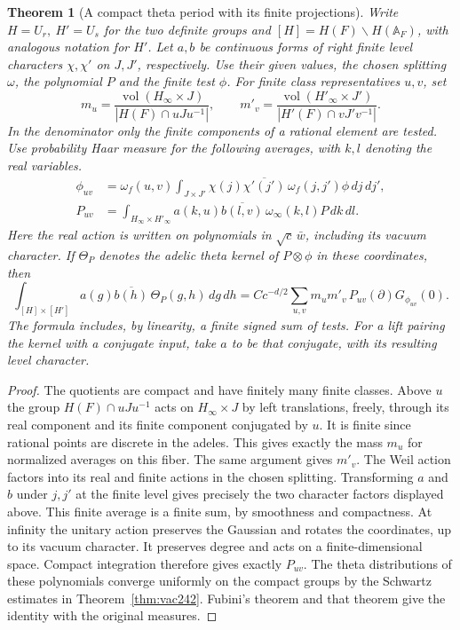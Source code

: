 \documentclass[a4paper,11pt]{article}
\newtheorem{theorem}[proposition]{Theorem}
\theoremstyle{definition}
\theoremstyle{remark}
\numberwithin{equation}{section}
\begin{document}
\begin{theorem}[A compact theta period with its finite projections]
\label{thm:edge242}
Write \(H=U_r,\ H'=U_s\) for the two definite groups and
\([H]=H(F)\backslash H(\mathbb A_F)\), with analogous notation
for \(H'\). Let \(a,b\) be continuous forms of right finite
level characters \(\chi,\chi'\) on \(J,J'\), respectively.
Use their given values, the chosen splitting \(\omega\), the
polynomial \(P\) and the finite test \(\phi\).
For finite class representatives \(u,v\), set
\[
 m_u=\frac{\operatorname{vol}(H_\infty\times J)}
                {|H(F)\cap uJu^{-1}|},\qquad
 m'_v=\frac{\operatorname{vol}(H'_\infty\times J')}
                {|H'(F)\cap vJ'v^{-1}|}.
\]
In the denominator only the finite components of a rational
element are tested. Use probability Haar measure for the following
averages, with \(k,l\) denoting the real variables.
\begin{align*}
 \phi_{uv}&=\omega_f(u,v)\int_{J\times J'}
       \chi(j)\overline{\chi'(j')}\,\omega_f(j,j')\phi\,dj\,dj',\\
 P_{uv}&=\int_{H_\infty\times H'_\infty}
            a(k,u)\overline{b(l,v)}\,\omega_\infty(k,l)P\,dk\,dl .
\end{align*}
Here the real action is written on polynomials in \(\sqrt c\,\bar w\),
including its vacuum character. If \(\Theta_P\) denotes the adelic
theta kernel of \(P\otimes\phi\) in these coordinates, then
\[
 \int_{[H]\times[H']}a(g)\overline{b(h)}\,\Theta_P(g,h)\,dg\,dh
  = Cc^{-d/2}\sum_{u,v}m_um'_v\,P_{uv}(\partial)G_{\phi_{uv}}(0).
\]
The formula includes, by linearity, a finite signed sum of tests.
For a lift pairing the kernel with a conjugate input, take \(a\)
to be that conjugate, with its resulting level character.
\end{theorem}
\begin{proof}
The quotients are compact and have finitely many finite classes.
Above \(u\) the group \(H(F)\cap uJu^{-1}\) acts on
\(H_\infty\times J\) by left translations, freely, through its
real component and its finite component conjugated by \(u\). It
is finite since rational points are discrete in the adeles.
This gives exactly the mass \(m_u\) for normalized averages on
this fiber. The same argument gives \(m'_v\). The Weil action
factors into its real and finite actions in the chosen splitting.
Transforming \(a\) and \(b\) under \(j,j'\) at the finite level
gives precisely the two character factors displayed above.
This finite average is a finite sum, by smoothness and compactness.
At infinity the unitary action preserves the Gaussian and rotates
the coordinates, up to its vacuum character. It preserves degree
and acts on a finite-dimensional space. Compact integration
therefore gives exactly \(P_{uv}\). The theta distributions of
these polynomials converge uniformly on the compact groups by the
Schwartz estimates in Theorem~\ref{thm:vac242}. Fubini's theorem
and that theorem give the identity with the original measures.
\end{proof}
\end{document}
